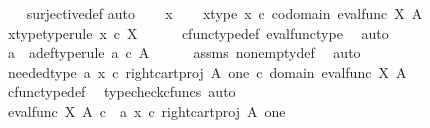 \begin{isabellebody}
%
\isadelimproof
\ \ %
\endisadelimproof
%
\isatagproof
{}\isamarkupfalse%
\ surjective{\isacharunderscore}{\kern0pt}def\isanewline
{}\isamarkupfalse%
{\isacharparenleft}{\kern0pt}auto{\isacharparenright}{\kern0pt}\isanewline
\ \ \isamarkupfalse%
\ x\isanewline
\ \ \isamarkupfalse%
\ x{\isacharunderscore}{\kern0pt}type{\isacharcolon}{\kern0pt}\ {\isachardoublequoteopen}x\ {\isasymin}\isactrlsub c\ codomain\ {\isacharparenleft}{\kern0pt}eval{\isacharunderscore}{\kern0pt}func\ X\ A{\isacharparenright}{\kern0pt}{\isachardoublequoteclose}\isanewline
\ \ \isamarkupfalse%
\ \isamarkupfalse%
\ x{\isacharunderscore}{\kern0pt}type{}{\isacharbrackleft}{\kern0pt}type{\isacharunderscore}{\kern0pt}rule{\isacharbrackright}{\kern0pt}{\isacharcolon}{\kern0pt}\ {\isachardoublequoteopen}x\ {\isasymin}\isactrlsub c\ X{\isachardoublequoteclose}\isanewline
\ \ \ \ \isamarkupfalse%
\ cfunc{\isacharunderscore}{\kern0pt}type{\isacharunderscore}{\kern0pt}def\ eval{\isacharunderscore}{\kern0pt}func{\isacharunderscore}{\kern0pt}type\ \isamarkupfalse%
\ auto\isanewline
\ \ \isamarkupfalse%
\ a\ \ a{\isacharunderscore}{\kern0pt}def{\isacharbrackleft}{\kern0pt}type{\isacharunderscore}{\kern0pt}rule{\isacharbrackright}{\kern0pt}{\isacharcolon}{\kern0pt}\ {\isachardoublequoteopen}a\ {\isasymin}\isactrlsub c\ A{\isachardoublequoteclose}\isanewline
\ \ \ \ \isamarkupfalse%
\ assms\ nonempty{\isacharunderscore}{\kern0pt}def\ \isamarkupfalse%
\ auto\isanewline
\ \ \isamarkupfalse%
\ needed{\isacharunderscore}{\kern0pt}type{\isacharcolon}{\kern0pt}\ {\isachardoublequoteopen}{\isasymlangle}a{\isacharcomma}{\kern0pt}\ {\isacharparenleft}{\kern0pt}x\ {\isasymcirc}\isactrlsub c\ right{\isacharunderscore}{\kern0pt}cart{\isacharunderscore}{\kern0pt}proj\ A\ one{\isacharparenright}{\kern0pt}\isactrlsup {\isasymsharp}{\isasymrangle}\ {\isasymin}\isactrlsub c\ domain\ {\isacharparenleft}{\kern0pt}eval{\isacharunderscore}{\kern0pt}func\ X\ A{\isacharparenright}{\kern0pt}{\isachardoublequoteclose}\isanewline
\ \ \ \ \isamarkupfalse%
\ cfunc{\isacharunderscore}{\kern0pt}type{\isacharunderscore}{\kern0pt}def\ \isamarkupfalse%
\ {\isacharparenleft}{\kern0pt}typecheck{\isacharunderscore}{\kern0pt}cfuncs{\isacharcomma}{\kern0pt}\ auto{\isacharparenright}{\kern0pt}\isanewline
\ \ \isamarkupfalse%
\ {\isachardoublequoteopen}{\isacharparenleft}{\kern0pt}eval{\isacharunderscore}{\kern0pt}func\ X\ A{\isacharparenright}{\kern0pt}\ {\isasymcirc}\isactrlsub c\ \ {\isasymlangle}a{\isacharcomma}{\kern0pt}\ {\isacharparenleft}{\kern0pt}x\ {\isasymcirc}\isactrlsub c\ right{\isacharunderscore}{\kern0pt}cart{\isacharunderscore}{\kern0pt}proj\ A\ one{\isacharparenright}{\kern0pt}\isactrlsup {\isasymsharp}{\isasymrangle}\ {\isacharequal}{\kern0pt}\ \ \ \ \isanewline

\end{isabellebody}
